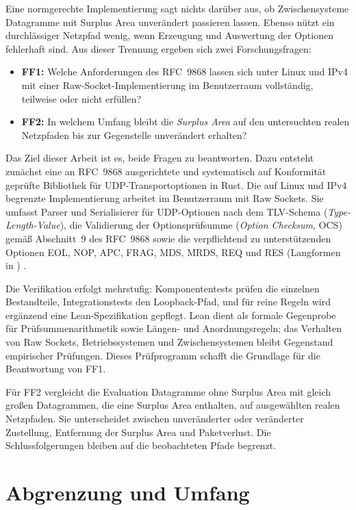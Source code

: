 Eine normgerechte Implementierung sagt nichts darüber aus, ob Zwischensysteme Datagramme mit Surplus Area
unverändert passieren lassen. Ebenso nützt ein durchlässiger Netzpfad wenig, wenn Erzeugung und Auswertung der
Optionen fehlerhaft sind. Aus dieser Trennung ergeben sich zwei Forschungsfragen:

\begin{itemize}
    \item \textbf{FF1:} Welche Anforderungen des RFC~9868 lassen sich unter Linux und IPv4 mit einer
        Raw-Socket-Implementierung im Benutzerraum vollständig, teilweise oder nicht erfüllen?

    \item \textbf{FF2:} In welchem Umfang bleibt die \textit{Surplus Area} auf den untersuchten realen
        Netzpfaden bis zur Gegenstelle unverändert erhalten?
\end{itemize}

Das Ziel dieser Arbeit ist es, beide Fragen zu beantworten. Dazu entsteht zunächst eine an RFC~9868 ausgerichtete
und systematisch auf Konformität geprüfte Bibliothek für UDP-Transportoptionen in Rust. Die auf Linux und IPv4
begrenzte Implementierung arbeitet im Benutzerraum mit Raw Sockets. Sie umfasst Parser und Serialisierer für
UDP-Optionen nach dem TLV-Schema (\textit{Type-Length-Value}), die Validierung der Optionsprüfsumme
(\textit{Option Checksum}, OCS) gemäß Abschnitt~9 des RFC~9868 sowie die verpflichtend zu unterstützenden Optionen
EOL, NOP, APC, FRAG, MDS, MRDS, REQ und RES (Langformen in ) \cite[Sec.~10]{rfc9868}.

Die Verifikation erfolgt mehrstufig: Komponententests prüfen die einzelnen Bestandteile, Integrationstests den
Loopback-Pfad, und für reine Regeln wird ergänzend eine Lean-Spezifikation gepflegt. Lean dient als formale
Gegenprobe für Prüfsummen\-arithmetik sowie Längen- und Anordnungsregeln; das Verhalten von Raw Sockets,
Betriebssystemen und Zwischensystemen bleibt Gegenstand empirischer Prüfungen. Dieses Prüfprogramm schafft die
Grundlage für die Beantwortung von FF1.

Für FF2 vergleicht die Evaluation Datagramme ohne Surplus Area mit gleich großen Datagrammen, die eine Surplus Area
enthalten, auf ausgewählten realen Netzpfaden. Sie unterscheidet zwischen unveränderter oder veränderter Zustellung,
Entfernung der Surplus Area und Paketverlust. Die Schlussfolgerungen bleiben auf die beobachteten Pfade begrenzt.

\section{Abgrenzung und Umfang}
\label{sec:abgrenzung}

